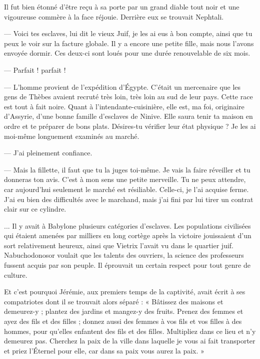 \documentclass[a4paper, 11pt, oneside, polutonikogreek, french]{article}
\begin{document}
Il fut bien étonné d'être reçu à sa porte par un grand diable tout noir et une vigoureuse commère à la face réjouie. Derrière eux se trouvait Nephtali.

--- Voici tes esclaves, lui dit le vieux Juif, je les ai eus à bon compte, ainsi que tu peux le voir sur la facture globale. Il y a encore une petite fille, mais nous l'avons envoyée dormir. Ces deux-ci sont loués pour une durée renouvelable de six mois.

--- Parfait ! parfait !

--- L'homme provient de l'expédition d'Égypte. C'était un mercenaire que les gens de Thèbes avaient recruté très loin, très loin au sud de leur pays. Cette race est tout à fait noire. Quant à l'intendante-cuisinière, elle est, ma foi, originaire d'Assyrie, d'une bonne famille d'esclaves de Ninive. Elle saura tenir ta maison en ordre et te préparer de bons plats. Désires-tu vérifier leur état physique ? Je les ai moi-même longuement examinés au marché.

--- J'ai pleinement confiance.

--- Mais la fillette, il faut que tu la juges toi-même. Je vais la faire réveiller et tu donneras ton avis. C'est à mon sens une petite merveille. Tu ne peux attendre, car aujourd'hui seulement le marché est résiliable. Celle-ci, je l'ai acquise ferme. J'ai eu bien des difficultés avec le marchand, mais j'ai fini par lui tirer un contrat clair sur ce cylindre.

\bigskip
\centerline{\EightStarTaper}
\centerline{\EightStarTaper\EightStarTaper}
\bigskip

... Il y avait à Babylone plusieurs catégories d'esclaves. Les populations civilisées qui étaient amenées par milliers en long cortège après la victoire jouissaient d'un sort relativement heureux, ainsi que Vietrix l'avait vu dans le quartier juif. Nabuchodonosor voulait que les talents des ouvriers, la science des professeurs fussent acquis par son peuple. Il éprouvait un certain respect pour tout genre de culture.

Et c'est pourquoi Jérémie, aux premiers temps de la captivité, avait écrit à ses compatriotes dont il se trouvait alors séparé : « Bâtissez des maisons et demeurez-y ; plantez des jardins et mangez-y des fruits. Prenez des femmes et ayez des fils et des filles ; donnez aussi des femmes à vos fils et vos filles à des hommes, pour qu'elles enfantent des fils et des filles. Multipliez dans ce lieu et n'y demeurez pas. Cherchez la paix de la ville dans laquelle je vous ai fait transporter et priez l'Éternel pour elle, car dans sa paix vous aurez la paix. »
\end{document}
